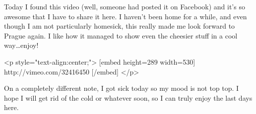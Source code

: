 \begin{post}
	\begin{content}
Today I found this video (well, someone had posted it on Facebook) and it's so awesome that I have to share it here. I haven't been home for a while, and even though I am not particularly homesick, this really made me look forward to Prague again. I like how it managed to show even the cheesier stuff in a cool way{\ldots}enjoy!

<p style="text-align:center;">
[embed height=289 width=530]
http://vimeo.com/32416450
[/embed]
</p>

On a completely different note, I got sick today so my mood is not top top. I hope I will get rid of the cold or whatever soon, so I can truly enjoy the last days here.
	\end{content}
\end{post}
